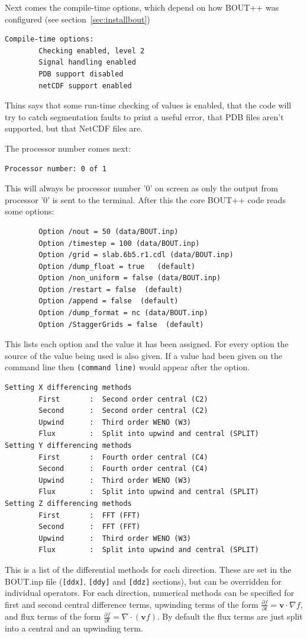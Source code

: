 \documentclass[12pt]{article}
\newcommand{\code}[1]{\texttt{#1}}
\def\L{\left}
\def\R{\right}
\newcommand{\deriv}[2]{\ensuremath{\frac{\partial #1}{\partial #2}}}
\newcommand{\ve}[1]{\ensuremath{\boldsymbol{#1}}}
\begin{document}
Next comes the compile-time options, which depend on how BOUT++ was configured
(see section~\ref{sec:installbout})
%
\begin{verbatim}
Compile-time options:
        Checking enabled, level 2
        Signal handling enabled
        PDB support disabled
        netCDF support enabled
\end{verbatim}
%
Thins says that some run-time checking of values is enabled, that the code will
try to catch segmentation faults to print a useful error, that PDB files aren't
supported, but that NetCDF files are.

The processor number comes next:
%
\begin{verbatim}
Processor number: 0 of 1
\end{verbatim}
%
This will always be processor number '0' on screen as only the output from
processor '0' is sent to the terminal. After this the core BOUT++ code reads
some options:
%
\begin{verbatim}
        Option /nout = 50 (data/BOUT.inp)
        Option /timestep = 100 (data/BOUT.inp)
        Option /grid = slab.6b5.r1.cdl (data/BOUT.inp)
        Option /dump_float = true   (default)
        Option /non_uniform = false (data/BOUT.inp)
        Option /restart = false  (default)
        Option /append = false  (default)
        Option /dump_format = nc (data/BOUT.inp)
        Option /StaggerGrids = false  (default)
\end{verbatim}
%
This lists each option and the value it has been assigned.  For every option
the source of the value being used is also given.  If a value had been given on
the command line then \texttt{(command line)} would appear after the option.

%
\begin{verbatim}
Setting X differencing methods
        First       :  Second order central (C2)
        Second      :  Second order central (C2)
        Upwind      :  Third order WENO (W3)
        Flux        :  Split into upwind and central (SPLIT)
Setting Y differencing methods
        First       :  Fourth order central (C4)
        Second      :  Fourth order central (C4)
        Upwind      :  Third order WENO (W3)
        Flux        :  Split into upwind and central (SPLIT)
Setting Z differencing methods
        First       :  FFT (FFT)
        Second      :  FFT (FFT)
        Upwind      :  Third order WENO (W3)
        Flux        :  Split into upwind and central (SPLIT)
\end{verbatim}
%
This is a list of the differential methods for each direction. These are set in
the BOUT.inp file (\code{[ddx]}, \code{[ddy]} and \code{[ddz]} sections), but
can be overridden for individual operators. For each direction, numerical
methods can be specified for first and second central difference terms,
upwinding terms of the form $\deriv{f}{t} = \ve{v}\cdot\nabla f$, and flux
terms of the form $\deriv{f}{t} = \nabla\cdot\L(\ve{v}f\R)$.  By default the
flux terms are just split into a central and an upwinding term.
\end{document}
